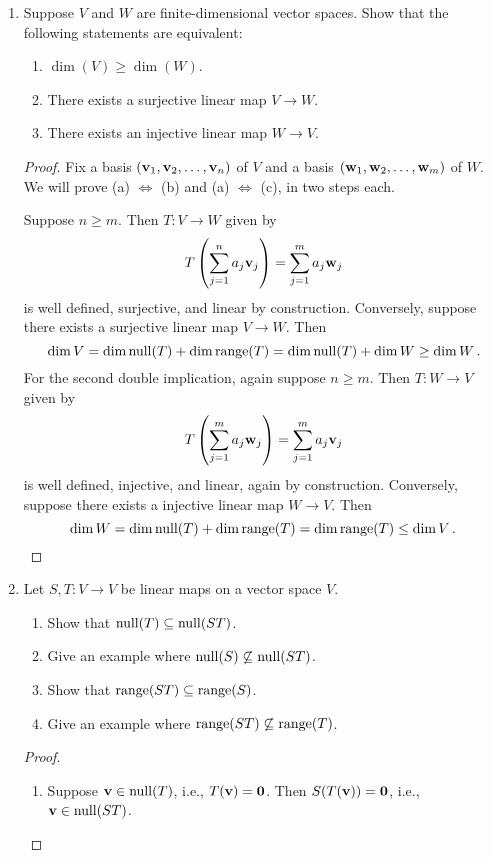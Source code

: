 \documentclass[11pt]{amsart}
\begin{document}
\begin{enumerate}[(1)]
\item Suppose $V$ and $W$ are finite-dimensional vector spaces. Show that the following statements are equivalent:
  \begin{enumerate}
  \item $\dim(V) \ge \dim(W)$.
  \item There exists a surjective linear map $V \rightarrow W$.
  \item There exists an injective linear map $W \rightarrow V$.
  \end{enumerate}

\begin{proof}
Fix a basis $\left( \mathbf v_1, \mathbf v_2, \dots, \mathbf v_n \right)$ of $V$ and a basis $\left( \mathbf w_1, \mathbf w_2, \dots, \mathbf w_m \right)$ of $W$.
We will prove (a) $\Longleftrightarrow$ (b) and (a) $\Longleftrightarrow$ (c), in two steps each.

Suppose $n \ge m$.
Then $T: V \rightarrow W$ given by
\[
  T \left( \sum_{ j=1 }^n a_j \mathbf v_j \right) = \sum_{ j=1 }^m a_j \mathbf w_j
\]
is well defined, surjective, and linear by construction.
Conversely, suppose there exists a surjective linear map $V \rightarrow W$. Then
\[
  \dim V = \dim \operatorname{null}(T) + \dim \operatorname{range}(T) = \dim \operatorname{null}(T) + \dim W \ge \dim W \, .
\]
For the second double implication, again suppose $n \ge m$.
Then $T: W \rightarrow V$ given by
\[
  T \left( \sum_{ j=1 }^m a_j \mathbf w_j \right) = \sum_{ j=1 }^m a_j \mathbf v_j
\]
is well defined, injective, and linear, again by construction.
Conversely, suppose there exists a injective linear map $W \rightarrow V$. Then
\[
  \dim W = \dim \operatorname{null}(T) + \dim \operatorname{range}(T) = \dim \operatorname{range}(T) \le \dim V \, . \qedhere
\]
\end{proof}

\item Let $S,T: V \rightarrow V$ be linear maps on a vector space $V$.
  \begin{enumerate}
  \item Show that $\operatorname{null}(T) \subseteq \operatorname{null}(ST)$.
  \item Give an example where $\operatorname{null}(S) \not\subseteq \operatorname{null}(ST)$.
  \item Show that $\operatorname{range}(ST) \subseteq \operatorname{range}(S)$.
  \item Give an example where  $\operatorname{range}(ST) \not\subseteq \operatorname{range}(T)$.
  \end{enumerate}

\begin{proof}
\begin{enumerate}

\item Suppose $\mathbf v \in \operatorname{null}(T)$, i.e., $T(\mathbf v) = \mathbf 0$. Then $S(T(\mathbf v)) = \mathbf 0$, i.e., $\mathbf v \in \operatorname{null}(ST)$.


\end{enumerate}
\end{proof}
\end{enumerate}
\end{document}
